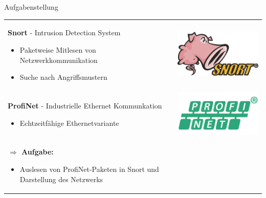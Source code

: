 \begin{frame}{Aufgabenstellung}
\begin{tabular}{m{8cm}r}
  \textbf{Snort} - Intrusion Detection System
    \begin{itemize}
      \item Paketweise Mitlesen von Netzwerkkommunikation
      \item Suche nach Angriffsmustern
    \end{itemize} & \includegraphics[width=0.2\linewidth]{images/max-snort} \\
  \pause
  \textbf{ProfiNet} - Industrielle Ethernet Kommunkation
    \begin{itemize}
      \item Echtzeitfähige Ethernetvariante
    \end{itemize} & \includegraphics[width=0.2\linewidth]{images/max-profinet} \\
  \pause
  \textbf{$\Rightarrow$ Aufgabe:}
  \begin{itemize}
    \item Auslesen von ProfiNet-Paketen in Snort und Darstellung des Netzwerks
\end{itemize}
\end{tabular}
\end{frame}

